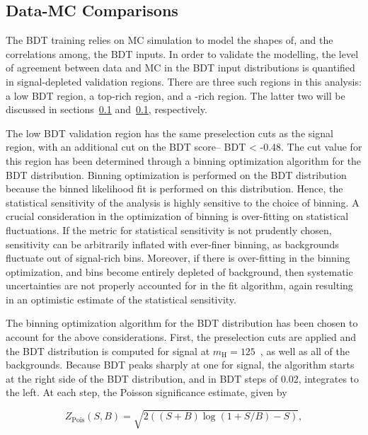 \subsection{Data-MC Comparisons}

The BDT training relies on MC simulation to model the shapes of, and
the correlations among, the BDT inputs. In order to validate the
modelling, the level of agreement between data and MC in the BDT input
distributions is quantified in signal-depleted validation
regions. There are three such regions in this analysis: a low BDT
region, a top-rich region, and a \ZDY-rich region. The latter two will
be discussed in sections~\ref{} and~\ref{}, respectively. 

The low BDT validation region has the same preselection cuts as the signal
region, with an additional cut on the BDT score-- BDT < -0.48. The cut
value for this region has been determined through a binning optimization
algorithm for the BDT distribution. Binning optimization is performed
on the BDT distribution because the binned likelihood fit is performed
on this distribution. Hence, the statistical sensitivity of the analysis is highly
sensitive to the choice of binning. A crucial consideration in the
optimization of binning is over-fitting on statistical
fluctuations. If the metric for statistical sensitivity is not
prudently chosen, sensitivity can be arbitrarily inflated
with ever-finer binning, as backgrounds fluctuate out of signal-rich
bins. Moreover, if there is over-fitting in the binning optimization,
and bins become entirely depleted of background, then systematic
uncertainties are not properly accounted for in the fit algorithm,
again resulting in an optimistic estimate of the statistical
sensitivity. 

The binning optimization algorithm for the BDT distribution has been
chosen to account for the above considerations. First, the
preselection cuts are applied and the BDT distribution is computed for
signal at $m_{\textrm{H}} = 125$~\gev, as well as all of the
backgrounds. Because BDT peaks sharply at one for signal, the
algorithm starts at the right side of the BDT distribution, and in
BDT steps of 0.02, integrates to the left. At each step, the Poisson
significance estimate, given by

\begin{equation}
\label{chap:analysis:equation:pois_sig}
Z_{\textrm{Pois}}(S,B) = \sqrt{2((S+B)\log{(1+S/B)}-S)},
\end{equation}


